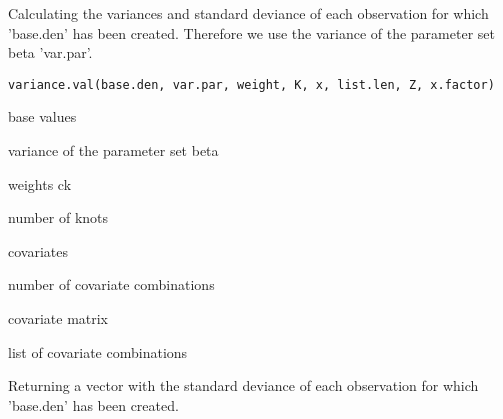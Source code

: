\begin{Description}\relax
Calculating the variances and standard deviance of each observation for which 'base.den' has been created. Therefore we use the variance of the parameter set beta 'var.par'.
\end{Description}
\begin{Usage}
\begin{verbatim}
variance.val(base.den, var.par, weight, K, x, list.len, Z, x.factor)
\end{verbatim}
\end{Usage}
\begin{Arguments}
\begin{ldescription}
\item[\code{base.den}] base values
\item[\code{var.par}] variance of the parameter set beta
\item[\code{weight}] weights ck
\item[\code{K}] number of knots
\item[\code{x}] covariates
\item[\code{list.len}] number of covariate combinations
\item[\code{Z}] covariate matrix
\item[\code{x.factor}] list of covariate combinations
\end{ldescription}
\end{Arguments}
\begin{Value}
Returning a vector with the standard deviance of each observation for which 'base.den' has been created.
\end{Value}

